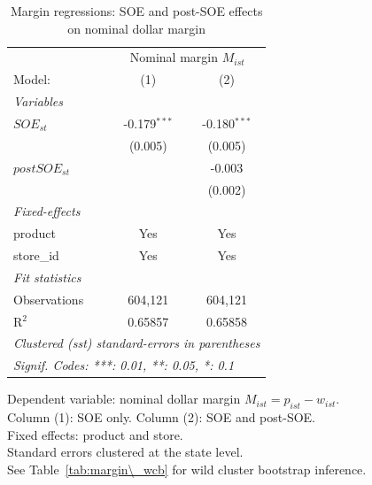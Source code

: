 
\begin{table}[htbp]
   \caption{\label{tab:margin_reg} Margin regressions: SOE and post-SOE effects on nominal dollar margin}
   \centering
   \begin{tabular}{lcc}
      \tabularnewline \midrule \midrule
       & \multicolumn{2}{c}{Nominal margin $M_{ist}$} \\ 
      Model:         & (1)            & (2)\\  
      \midrule
      \emph{Variables}\\
      $SOE_{st}$     & -0.179$^{***}$ & -0.180$^{***}$\\   
                     & (0.005)        & (0.005)\\   
      $postSOE_{st}$ &                & -0.003\\   
                     &                & (0.002)\\   
      \midrule
      \emph{Fixed-effects}\\
      product        & Yes            & Yes\\  
      store\_id      & Yes            & Yes\\  
      \midrule
      \emph{Fit statistics}\\
      Observations   & 604,121        & 604,121\\  
      R$^2$          & 0.65857        & 0.65858\\  
      \midrule \midrule
      \multicolumn{3}{l}{\emph{Clustered (sst) standard-errors in parentheses}}\\
      \multicolumn{3}{l}{\emph{Signif. Codes: ***: 0.01, **: 0.05, *: 0.1}}\\
   \end{tabular}
   
   \par \raggedright 
   Dependent variable: nominal dollar margin $M_{ist} = p_{ist} - w_{ist}$.\\
   Column (1): SOE only. Column (2): SOE and post-SOE.\\
   Fixed effects: product and store.\\
   Standard errors clustered at the state level.\\
   See Table~\ref{tab:margin\_wcb} for wild cluster bootstrap inference.
\end{table}


